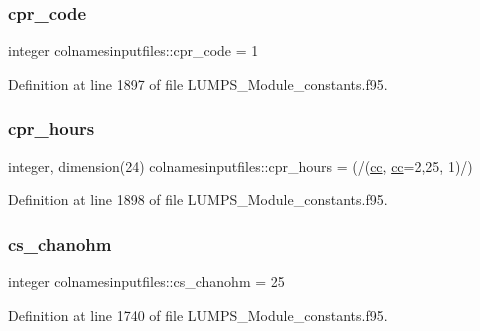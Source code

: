 \subsubsection{\texorpdfstring{cpr\+\_\+code}{cpr\_code}}
{\footnotesize\ttfamily integer colnamesinputfiles\+::cpr\+\_\+code = 1}



Definition at line 1897 of file L\+U\+M\+P\+S\+\_\+\+Module\+\_\+constants.\+f95.

\mbox{\label{namespacecolnamesinputfiles_a36cac26a00244cef8f0f55f3c6769bf0}} 
\subsubsection{\texorpdfstring{cpr\+\_\+hours}{cpr\_hours}}
{\footnotesize\ttfamily integer, dimension(24) colnamesinputfiles\+::cpr\+\_\+hours = (/(\hyperlink{namespacecolnamesinputfiles_aee7fac5f3ecf99c110512bc11d4cd8a4}{cc}, \hyperlink{namespacecolnamesinputfiles_aee7fac5f3ecf99c110512bc11d4cd8a4}{cc}=2,25, 1)/)}



Definition at line 1898 of file L\+U\+M\+P\+S\+\_\+\+Module\+\_\+constants.\+f95.

\mbox{\label{namespacecolnamesinputfiles_a002123e1a4d6e3102987980f56dacdd9}} 
\subsubsection{\texorpdfstring{cs\+\_\+chanohm}{cs\_chanohm}}
{\footnotesize\ttfamily integer colnamesinputfiles\+::cs\+\_\+chanohm = 25}



Definition at line 1740 of file L\+U\+M\+P\+S\+\_\+\+Module\+\_\+constants.\+f95.

\mbox{\label{namespacecolnamesinputfiles_a1252e22c70ac9a8361c876e3a670d98b}} 

